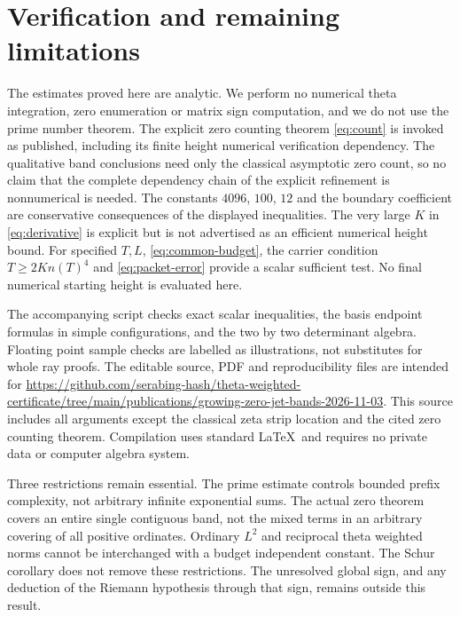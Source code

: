 \documentclass[11pt]{article}
\theoremstyle{remark}
\begin{document}
\section{Verification and remaining limitations}
The estimates proved here are analytic. We perform no numerical theta
integration, zero enumeration or matrix sign computation, and we do not
use the prime number theorem. The explicit zero counting theorem
\eqref{eq:count} is invoked as published, including its finite height
numerical verification dependency. The qualitative band conclusions need
only the classical asymptotic zero count, so no claim that the complete
dependency chain of the explicit refinement is nonnumerical is needed.
The constants $4096$, $100$, $12$ and the boundary coefficient are
conservative consequences of the displayed inequalities.
The very large $K$ in \eqref{eq:derivative} is explicit but is not
advertised as an efficient numerical height bound.
For specified $T,L$, \eqref{eq:common-budget}, the carrier condition
$T\ge2Kn(T)^4$ and \eqref{eq:packet-error} provide a scalar sufficient
test. No final numerical starting height is evaluated here.

The accompanying script checks exact scalar inequalities, the basis
endpoint formulas in simple configurations, and the two by two determinant
algebra. Floating point sample checks are labelled as illustrations,
not substitutes for whole ray proofs.
The editable source, PDF and reproducibility files are intended for
\url{https://github.com/serabing-hash/theta-weighted-certificate/tree/main/publications/growing-zero-jet-bands-2026-11-03}.
This source includes all arguments except the classical zeta strip
location and the cited zero counting theorem. Compilation uses standard \LaTeX\ and requires no
private data or computer algebra system.

Three restrictions remain essential. The prime estimate controls bounded
prefix complexity, not arbitrary infinite exponential sums.
The actual zero theorem covers an entire single contiguous band, not
the mixed terms in an arbitrary covering of all positive ordinates.
Ordinary $L^2$ and reciprocal theta weighted norms cannot be interchanged
with a budget independent constant. The Schur corollary does not remove
these restrictions. The unresolved global sign, and any deduction of
the Riemann hypothesis through that sign, remains outside this result.
\end{document}

